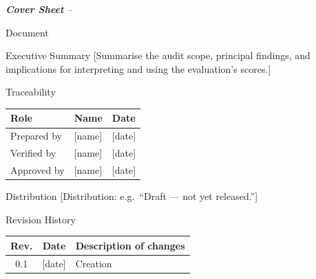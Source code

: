 \gdef\ppartname{Cover Sheet}

\begin{adjustwidth}{5mm}{5mm}

\noindent
{\LARGE\itshape \textbf{Cover Sheet} -- \evaltitle}\par\medskip

\medskip

\noindent
\begin{dsbox}{Document}
\end{dsbox}

\noindent
\begin{dsbox}{Executive Summary}
[Summarise the audit scope, principal findings, and implications for
interpreting and using the evaluation's scores.]
\end{dsbox}

\noindent
\begin{dsbox}{Traceability}
\renewcommand{\arraystretch}{1.15}%
\noindent\begin{tabularx}{\linewidth}{|L{0.7}|L{1.5}|L{0.8}|}
\hline
\textbf{Role} & \textbf{Name} & \textbf{Date} \\ \hline
Prepared by & [name] & [date] \\ \hline
Verified by & [name] & [date] \\ \hline
Approved by & [name] & [date] \\ \hline
\end{tabularx}
\end{dsbox}

\noindent
\begin{dsbox}{Distribution}
[Distribution: e.g.\ ``Draft --- not yet released.'']
\end{dsbox}

\noindent
\begin{dsbox}{Revision History}
\renewcommand{\arraystretch}{1.15}%
\noindent\begin{tabularx}{\linewidth}{|C{0.35}|C{0.55}|L{2.1}|}
\hline
\textbf{Rev.} & \textbf{Date} & \textbf{Description of changes} \\  & [date] & Creation \\ \hline
\end{tabularx}
\end{dsbox}

\end{adjustwidth}

